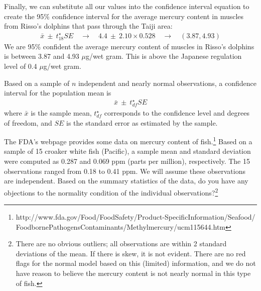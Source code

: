 Finally, we can substitute all our values into the confidence interval equation to create the 95\% confidence interval for the average mercury content in muscles from Risso's dolphins that pass through the Taiji area:
\begin{eqnarray*}
\bar{x} \ \pm\  t^{\star}_{18}SE
	\quad \to \quad
4.4 \ \pm\  2.10 \times 0.528
	\quad \to \quad
(3.87, 4.93)
\end{eqnarray*}
We are 95\% confident the average mercury content of muscles in Risso's dolphins is between 3.87 and 4.93 $\mu$g/wet gram. This is above the Japanese regulation level of 0.4 $\mu$g/wet gram.


\begin{termBox}{
Based on a sample of $n$ independent and nearly normal observations, a confidence interval for the population mean is
\begin{eqnarray*}
\bar{x} \ \pm\  t^{\star}_{df}SE
\end{eqnarray*}
where $\bar{x}$ is the sample mean, $t^{\star}_{df}$ corresponds to the confidence level and degrees of freedom, and $SE$ is the standard error as estimated by the sample.}
\end{termBox}

\begin{exercise} \label{croakerWhiteFishPacificExerConditions}
The FDA's webpage provides some data on mercury content of fish.\footnote{http://www.fda.gov/Food/FoodSafety/Product-SpecificInformation/Seafood/\\ FoodbornePathogensContaminants/Methylmercury/ucm115644.htm} Based on a sample of 15 croaker white fish (Pacific), a sample mean and standard deviation were computed as 0.287 and 0.069 ppm (parts per million), respectively. The 15 observations ranged from 0.18 to 0.41 ppm. We will assume these observations are independent. Based on the summary statistics of the data, do you have any objections to the normality condition of the individual observations?\footnote{There are no obvious outliers; all observations are within 2 standard deviations of the mean. If there is skew, it is not evident. There are no red flags for the normal model based on this (limited) information, and we do not have reason to believe the mercury content is not nearly normal in this type of fish.}
\end{exercise}

